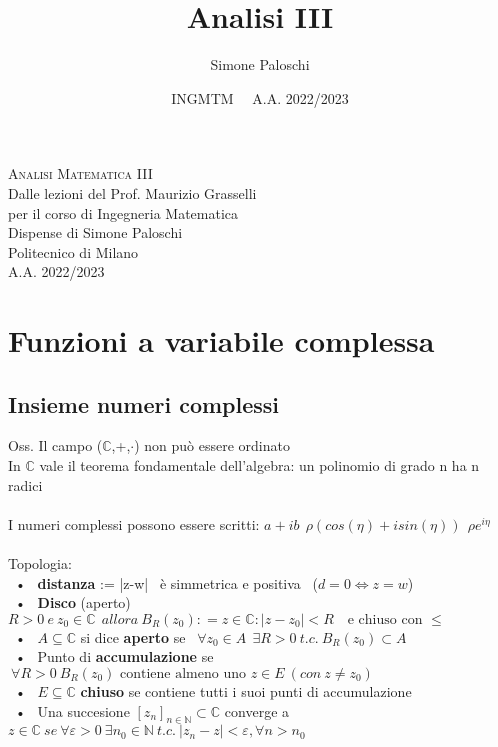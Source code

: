 \documentclass{article}
\title{Analisi III}
\author{Simone Paloschi}
\date{INGMTM \ \ A.A. 2022/2023}
\theoremstyle{unnumbered}
\theoremstyle{unnumbered1}
\begin{document}
\vspace*{\fill}
\begin{center}
	{\Huge \textsc{Analisi Matematica III}}\\
	\vspace*{1.4cm}
	{\large {Dalle lezioni del Prof. Maurizio Grasselli}}\\
	\vspace*{0.2cm}
	{\large per il corso di Ingegneria Matematica}\\
	\vspace*{1cm}
	{\large {Dispense di Simone Paloschi}}\\
	\vspace*{1cm}
	Politecnico di Milano\\
	\vspace*{0.2cm}
	A.A. 2022/2023
\end{center}
\vspace{7cm}
\vspace*{\fill}

\newpage

\begingroup
  \hypersetup{hidelinks}
  \tableofcontents
\endgroup


\pagebreak


\section{Funzioni a variabile complessa}

\subsection{
Insieme numeri complessi}
Oss. Il campo ($\mathbb{C}$,+,$\cdot$) non può essere ordinato \\
In $\mathbb{C}$ vale il teorema fondamentale dell'algebra: un polinomio di grado n ha n radici\\ \\
%
I numeri complessi possono essere scritti: $a +ib \ \ \rho(cos(\eta)+isin(\eta)) \ \ \rho e^{i\eta}$\\ \\
%
Topologia:\\
\ • \ \textbf{distanza} := |z-w| \ è  simmetrica e positiva \ ($d=0 \Leftrightarrow z=w$)\\
%
\ • \ \textbf{Disco}  (aperto) \ \ $R>0 \ e \ z_0 \in \mathbb{C} \ \ allora \ B_R(z_0) : = { z\in \mathbb{C} : |z-z_0|<R } \ \ \ \text{ e chiuso con } \le$\\
%
\ • \ $A\subseteq\mathbb{C}$ si dice \textbf{aperto} se \ $\forall z_0 \in A \ \ \exists R>0 \ t.c. \ B_R(z_0) \subset A$\\
%
\ • \ Punto di \textbf{accumulazione} se $\ \forall R>0 \ B_R(z_0)  \text{ contiene almeno uno } z \in E \ (con \ z \neq z_0)$\\
%
\ • \ $E\subseteq\mathbb{C}$ \textbf{chiuso} se contiene tutti i suoi punti di accumulazione \\
\ • \ Una succesione $[z_n]_{n\in\mathbb{N} } \subset \mathbb{C} $ converge a $ z \in \mathbb{C} \ se \ \forall \varepsilon >0 \ \exists n_0 \in \mathbb{N} \ t.c. \ |z_n-z| < \varepsilon, \forall n>n_0$ \\
\end{document}
